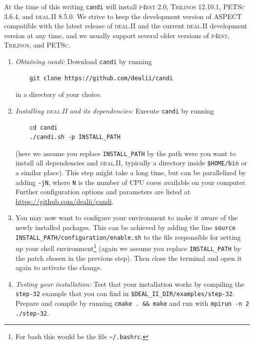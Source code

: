 \documentclass{article}
\newcommand{\dealii}{{\textsc{deal.II}}}
\newcommand{\pfrst}{{\normalfont\textsc{p4est}}}
\newcommand{\trilinos}{{\textsc{Trilinos}}}
\newcommand{\petsc}{{\textsc{PETSc}}}
\newcommand{\aspect}{\textsc{ASPECT}}
\begin{document}
At the time of this writing \texttt{candi} will install \pfrst{} 2.0,
\trilinos{} 12.10.1,  \petsc{} 3.6.4, and \dealii{} 8.5.0. 
We strive to keep the development version of \aspect{} compatible with 
the latest release of \dealii{} and the current \dealii{} development 
version at any time, and we usually support several older versions of
\pfrst{}, \trilinos{}, and \petsc{}.

\begin{enumerate}
\item \textit{Obtaining candi:} Download \texttt{candi} by running 
    \begin{verbatim}
    git clone https://github.com/dealii/candi
    \end{verbatim} 
    in a directory of your choice. 

\item \textit{Installing \dealii{} and its dependencies:} Execute \texttt {candi} by running
    \begin{verbatim}
    cd candi
    ./candi.sh -p INSTALL_PATH
    \end{verbatim} 
    (here we assume you replace \texttt{INSTALL\_PATH} by the path were
    you want to install all dependencies and \dealii{}, typically a directory inside
    \texttt{\$HOME/bin} or a similar place). 
    This step might take a long time, but can be parallelized by adding 
    \texttt{-jN}, where 
    \texttt{N} is the number of CPU cores available on your computer. Further configuration options 
    and parameters are listed at \url{https://github.com/dealii/candi}.

\item You may now want to configure your environment to make it aware of the newly installed
    packages. This can be achieved by adding the line 
    \texttt{source INSTALL\_PATH/configuration/enable.sh} to the file responsible for setting
    up your shell environment\footnote{For bash this would be the file \texttt{\~{}/.bashrc}.} 
    (again we assume you replace \texttt{INSTALL\_PATH} by the patch chosen in the previous step).
    Then close the terminal and open it again to activate the change.

\item \textit{Testing your installation:} Test that your installation works
  by compiling the {\texttt{step-32}} example that you can find in
  {\texttt{\$DEAL\_II\_DIR/examples/step-32}}. Prepare and compile by running {\texttt{cmake . \&\& make}} 
  and run with {\texttt{mpirun -n 2 ./step-32}}.

\end{enumerate}
\end{document}
